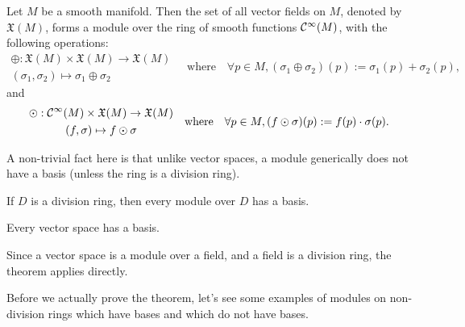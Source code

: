 \begin{proposition}
	Let \(M\) be a smooth manifold. Then the set of all vector fields on \(M\), denoted by \(\mathfrak{X}(M)\), forms a module over the ring of smooth functions \(\mathcal C^\infty(M)\), with the following operations:
	\begin{equation}
		\begin{gathered}
			\oplus: \mathfrak{X}(M) \times \mathfrak{X}(M) \to \mathfrak{X}(M)              \\
			(\sigma_1, \sigma_2)                           \mapsto \sigma_1 \oplus \sigma_2
		\end{gathered}
		\quad \text{where} \quad \forall p \in M, (\sigma_1 \oplus \sigma_2) (p) := \sigma_1(p) + \sigma_2(p),
	\end{equation}
	and
	\begin{equation}
		\begin{gathered}
			\odot: \mathcal C^\infty(M) \times \mathfrak{X}(M) \to \mathfrak{X}(M)    \\
			(f, \sigma)                                 \mapsto f \odot \sigma
		\end{gathered}
		\quad \text{where} \quad \forall p \in M, (f \odot \sigma) (p) := f(p) \cdot \sigma(p).
	\end{equation}
\end{proposition}
A non-trivial fact here is that unlike vector spaces, a module generically does not have a basis (unless the ring is a division ring).
\begin{theorem}\label{thm:module_basis}
	If \(D\) is a division ring, then every module over \(D\) has a basis.
\end{theorem}
\begin{corollary}
	Every vector space has a basis.
\end{corollary}
\begin{Proof}
	Since a vector space is a module over a field, and a field is a division ring, the theorem applies directly.
\end{Proof}
Before we actually prove the theorem, let's see some examples of modules on non-division rings which have bases and which do not have bases.
